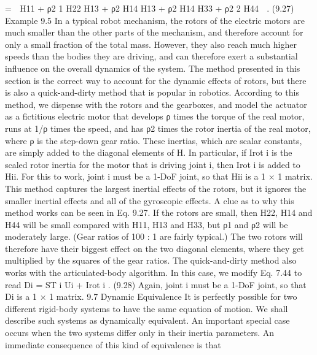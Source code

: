 =  H11 + ρ2 1 H22 H13 + ρ2 H14 H13 + ρ2 H14 H33 + ρ2 2 H44  . (9.27) Example 9.5 In a typical robot mechanism, the rotors of the electric motors are much smaller than the other parts of the mechanism, and therefore account for only a small fraction of the total mass. However, they also reach much higher speeds than the bodies they are driving, and can therefore exert a substantial influence on the overall dynamics of the system. The method presented in this section is the correct way to account for the dynamic effects of rotors, but there is also a quick-and-dirty method that is popular in robotics. According to this method, we dispense with the rotors and the gearboxes, and model the actuator as a fictitious electric motor that develops ρ times the torque of the real motor, runs at 1/ρ times the speed, and has ρ2 times the rotor inertia of the real motor, where ρ is the step-down gear ratio. These inertias, which are scalar constants, are simply added to the diagonal elements of H. In particular, if Irot i is the scaled rotor inertia for the motor that is driving joint i, then Irot i is added to Hii. For this to work, joint i must be a 1-DoF joint, so that Hii is a 1 × 1 matrix. This method captures the largest inertial effects of the rotors, but it ignores the smaller inertial effects and all of the gyroscopic effects. A clue as to why this method works can be seen in Eq. 9.27. If the rotors are small, then H22, H14 and H44 will be small compared with H11, H13 and H33, but ρ1 and ρ2 will be moderately large. (Gear ratios of 100 : 1 are fairly typical.) The two rotors will therefore have their biggest effect on the two diagonal elements, where they get multiplied by the squares of the gear ratios. The quick-and-dirty method also works with the articulated-body algorithm. In this case, we modify Eq. 7.44 to read Di = ST i Ui + Irot i . (9.28) Again, joint i must be a 1-DoF joint, so that Di is a 1 × 1 matrix. 9.7 Dynamic Equivalence It is perfectly possible for two different rigid-body systems to have the same equation of motion. We shall describe such systems as dynamically equivalent. An important special case occurs when the two systems differ only in their inertia parameters. An immediate consequence of this kind of equivalence is that

